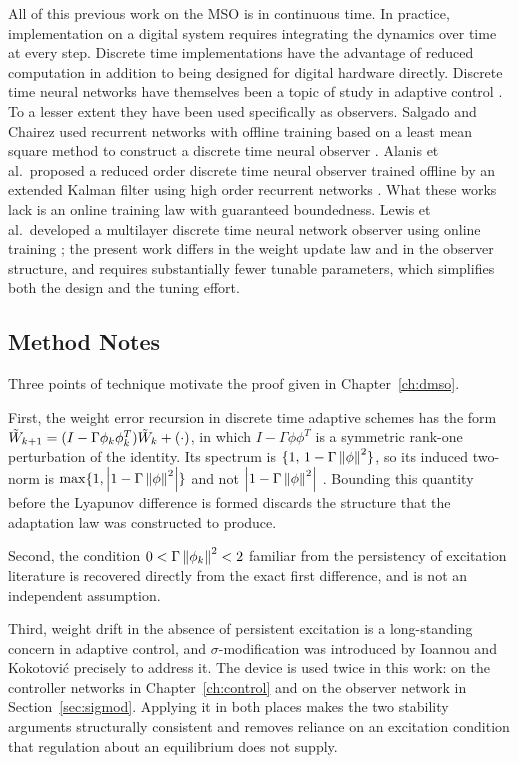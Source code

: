 All of this previous work on the MSO is in continuous time. In practice,
implementation on a digital system requires integrating the dynamics over time
at every step. Discrete time implementations have the advantage of reduced
computation in addition to being designed for digital hardware directly.
Discrete time neural networks have themselves been a topic of study in adaptive
control \cite{jagannathan2006neural}. To a lesser extent they have been used
specifically as observers. Salgado and Chairez used recurrent networks with
offline training based on a least mean square method to construct a discrete
time neural observer \cite{salgado2013nonlinear}. Alanis et al.\ proposed a
reduced order discrete time neural observer trained offline by an extended
Kalman filter using high order recurrent networks \cite{alanis2010reduced}. What
these works lack is an online training law with guaranteed boundedness. Lewis et
al.\ developed a multilayer discrete time neural network observer using online
training \cite{lewis1999neural}; the present work differs in the weight update
law and in the observer structure, and requires substantially fewer tunable
parameters, which simplifies both the design and the tuning effort.

\subsection{Method Notes}

Three points of technique motivate the proof given in Chapter~\ref{ch:dmso}.

First, the weight error recursion in discrete time adaptive schemes has the form
$\tilde{W}_{k+1}=(I-\Gamma\phi_k\phi_k^T)\tilde{W}_k+(\cdot)$, in which
$I-\Gamma\phi\phi^T$ is a symmetric rank-one perturbation of the identity. Its
spectrum is $\{1,\,1-\Gamma\left\lVert \phi \right\rVert^2\}$, so its induced two-norm is
$\max\{1,\left\lvert 1-\Gamma\left\lVert \phi \right\rVert^2 \right\rvert\}$ and not $\left\lvert 1-\Gamma\left\lVert \phi \right\rVert^2 \right\rvert$
\cite{horn2013matrix}. Bounding this quantity before the Lyapunov difference is
formed discards the structure that the adaptation law was constructed to
produce.

Second, the condition $0<\Gamma\left\lVert \phi_k \right\rVert^2<2$ familiar from the persistency
of excitation literature \cite{sadegh1993nonlinear,lewis1999neural} is recovered
directly from the exact first difference, and is not an independent assumption.

Third, weight drift in the absence of persistent excitation is a long-standing
concern in adaptive control, and $\sigma$-modification was introduced by Ioannou
and Kokotovi\'c \cite{ioannou1983adaptive,ioannou1984sigma} precisely to address
it. The device is used twice in this work: on the controller networks in
Chapter~\ref{ch:control} and on the observer network in
Section~\ref{sec:sigmod}. Applying it in both places makes
the two stability arguments structurally consistent and removes reliance on an
excitation condition that regulation about an equilibrium does not supply.

